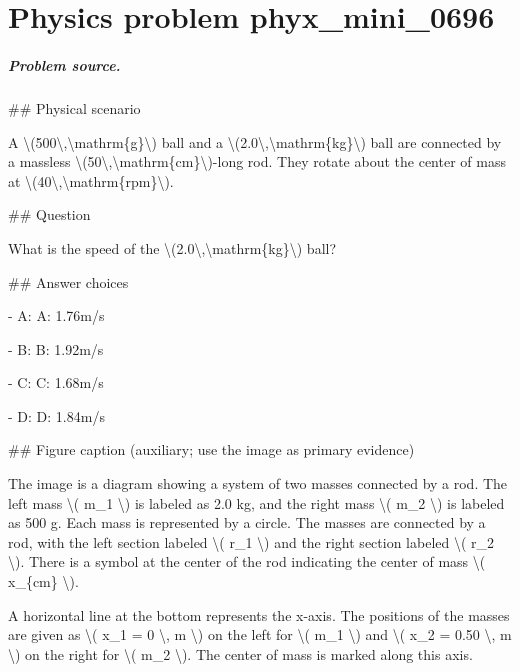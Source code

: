 
\chapter{Physics problem phyx\_mini\_0696}
\label{ch:PhyXMiniProblems_problem_phyx_mini_0696}

\paragraph{Problem source.}
\#\# Physical scenario

A \textbackslash{}(500\textbackslash{},\textbackslash{}mathrm\{g\}\textbackslash{}) ball and a \textbackslash{}(2.0\textbackslash{},\textbackslash{}mathrm\{kg\}\textbackslash{}) ball are connected by a massless \textbackslash{}(50\textbackslash{},\textbackslash{}mathrm\{cm\}\textbackslash{})-long rod. They rotate about the center of mass at \textbackslash{}(40\textbackslash{},\textbackslash{}mathrm\{rpm\}\textbackslash{}).

\#\# Question

What is the speed of the \textbackslash{}(2.0\textbackslash{},\textbackslash{}mathrm\{kg\}\textbackslash{}) ball?

\#\# Answer choices

- A: A: 1.76m/s

- B: B: 1.92m/s

- C: C: 1.68m/s

- D: D: 1.84m/s

\#\# Figure caption (auxiliary; use the image as primary evidence)

The image is a diagram showing a system of two masses connected by a rod. The left mass \textbackslash{}( m\_1 \textbackslash{}) is labeled as 2.0 kg, and the right mass \textbackslash{}( m\_2 \textbackslash{}) is labeled as 500 g. Each mass is represented by a circle. The masses are connected by a rod, with the left section labeled \textbackslash{}( r\_1 \textbackslash{}) and the right section labeled \textbackslash{}( r\_2 \textbackslash{}). There is a symbol at the center of the rod indicating the center of mass \textbackslash{}( x\_\{cm\} \textbackslash{}).

A horizontal line at the bottom represents the x-axis. The positions of the masses are given as \textbackslash{}( x\_1 = 0 \textbackslash{}, m \textbackslash{}) on the left for \textbackslash{}( m\_1 \textbackslash{}) and \textbackslash{}( x\_2 = 0.50 \textbackslash{}, m \textbackslash{}) on the right for \textbackslash{}( m\_2 \textbackslash{}). The center of mass is marked along this axis.

